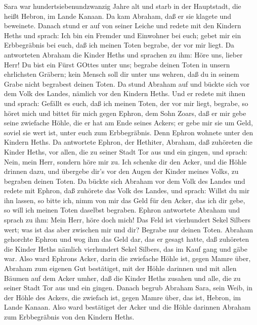  Sara war hundertsiebenundzwanzig Jahre alt  und
starb in der Hauptstadt, die heißt Hebron, im Lande Kanaan. Da kam
Abraham, daß er sie klagete und beweinete.  Danach stund er
auf von seiner Leiche und redete mit den Kindern Heths und sprach:
 Ich bin ein Fremder und Einwohner bei euch; gebet mir ein
Erbbegräbnis bei euch, daß ich meinen Toten begrabe, der vor mir liegt.
 Da antworteten Abraham die Kinder Heths und sprachen zu
ihm:  Höre uns, lieber Herr! Du bist ein Fürst GOttes unter
uns; begrabe deinen Toten in unsern ehrlichsten Gräbern; kein Mensch
soll dir unter uns wehren, daß du in seinem Grabe nicht begrabest deinen
Toten.  Da stund Abraham auf und bückte sich vor dem Volk
des Landes, nämlich vor den Kindern Heths.  Und er redete
mit ihnen und sprach: Gefällt es euch, daß ich meinen Toten, der vor mir
liegt, begrabe, so höret mich und bittet für mich gegen Ephron, dem Sohn
Zoars,  daß er mir gebe seine zwiefache Höhle, die er hat am
Ende seines Ackers; er gebe mir sie um Geld, soviel sie wert ist, unter
euch zum Erbbegräbnis.  Denn Ephron wohnete unter den
Kindern Heths. Da antwortete Ephron, der Hethiter, Abraham, daß
zuhöreten die Kinder Heths, vor allen, die zu seiner Stadt Tor aus und
ein gingen, und sprach:  Nein, mein Herr, sondern höre mir
zu. Ich schenke dir den Acker, und die Höhle drinnen dazu, und übergebe
dir's vor den Augen der Kinder meines Volks, zu begraben deinen Toten.
 Da bückte sich Abraham vor dem Volk des Landes
 und redete mit Ephron, daß zuhörete das Volk des Landes,
und sprach: Willst du mir ihn lassen, so bitte ich, nimm von mir das
Geld für den Acker, das ich dir gebe, so will ich meinen Toten daselbst
begraben.  Ephron antwortete Abraham und sprach zu ihm:
 Mein Herr, höre doch mich! Das Feld ist vierhundert Sekel
Silbers wert; was ist das aber zwischen mir und dir? Begrabe nur deinen
Toten.  Abraham gehorchte Ephron und wog ihm das Geld dar,
das er gesagt hatte, daß zuhöreten die Kinder Heths nämlich vierhundert
Sekel Silbers, das im Kauf gang und gäbe war.  Also ward
Ephrons Acker, darin die zwiefache Höhle ist, gegen Mamre über, Abraham
zum eigenen Gut bestätiget, mit der Höhle darinnen und mit allen Bäumen
auf dem Acker umher,  daß die Kinder Heths zusahen und
alle, die zu seiner Stadt Tor aus und ein gingen.  Danach
begrub Abraham Sara, sein Weib, in der Höhle des Ackers, die zwiefach
ist, gegen Mamre über, das ist, Hebron, im Lande Kanaan. 
Also ward bestätiget der Acker und die Höhle darinnen Abraham zum
Erbbegräbnis von den Kindern Heths.

